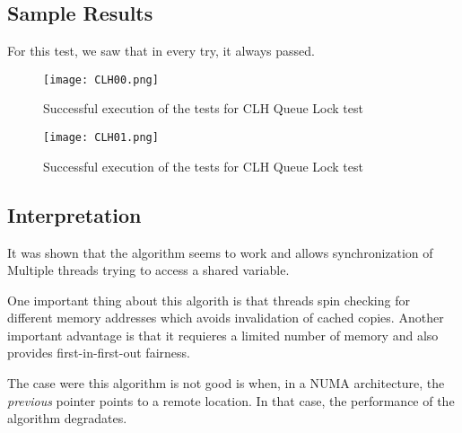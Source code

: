 \subsection{Sample Results}
\par
For this test, we saw that in every try, it always passed.
\par
\begin{figure}[h]
  \centering
  \texttt{[image: CLH00.png]}
  \caption{Successful execution of the tests for CLH Queue Lock test}
  \label{fig:CLH00}
\end{figure}
\par
\begin{figure}[h]
  \centering
  \texttt{[image: CLH01.png]}
  \caption{Successful execution of the tests  for CLH Queue Lock test}
  \label{fig:CLH01}
\end{figure}
\par
\subsection{Interpretation}
It was shown that the algorithm seems to work and allows synchronization of Multiple threads trying to access a shared variable.
\par
One important thing about this algorith is that threads spin checking for different memory addresses which avoids invalidation of cached copies. Another important advantage is that it requieres a limited number of memory and also provides first-in-first-out fairness. 
\par
The case were this algorithm is not good is when, in a NUMA architecture, the \textit{previous} pointer points to a remote location. In that case, the performance of the algorithm degradates.
